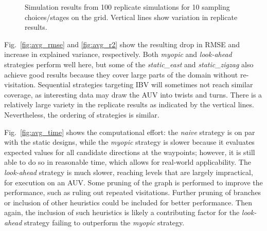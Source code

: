 \documentclass[aoas]{imsart}
\begin{document}
\begin{figure}[!h]
  \hfill {}
  \caption{Simulation results from 100 replicate simulations for 10
    sampling choices/stages on the grid. Vertical lines show variation
    in replicate results.}
\label{fig:sim_results}
\end{figure}

Fig.~\ref{fig:avg_rmse} and \ref{fig:avg_r2} show the resulting drop
in RMSE and increase in explained variance, respectively. Both
\textit{myopic} and \textit{look-ahead} strategies perform well here,
but some of the \textit{static\_east} and \textit{static\_zigzag} also
achieve good results because they cover large parts of the domain
without re-visitation. Sequential strategies targeting IBV will
sometimes not reach similar coverage, as interesting data may draw the
AUV into twists and turns. There is a relatively large variety in the
replicate results as indicated by the vertical lines. Nevertheless,
the ordering of strategies is similar.


Fig.~\ref{fig:avg_time} shows the computational effort: the
\textit{naive} strategy is on par with the static designs, while the
\textit{myopic} strategy is slower because it evaluates expected
values for all candidate directions at the waypoints; however, it is still
able to do so in reasonable time, which allows for real-world
applicability. The \textit{look-ahead} strategy is much slower, reaching levels that
are largely impractical, for execution on an AUV. Some pruning of the
graph is performed to improve the performance, such as ruling out
repeated visitations. Further pruning of branches or inclusion of
other heuristics could be included for better performance. Then again,
the inclusion of such heuristics is likely a contributing factor for
the \textit{look-ahead} strategy failing to outperform the
\textit{myopic} strategy.
\end{document}
